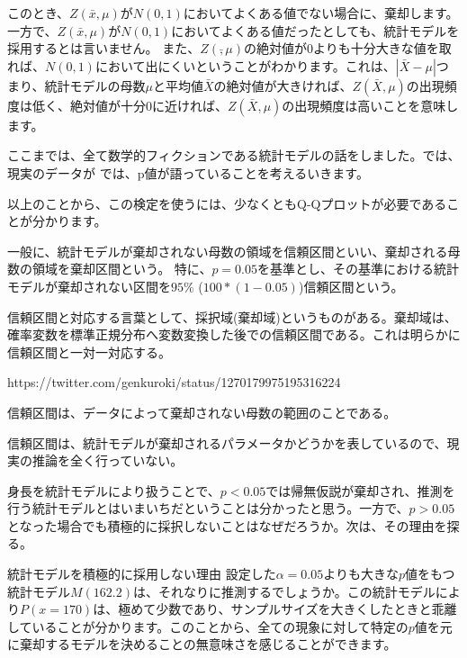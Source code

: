 \fi







このとき、$Z(\bar{x},\mu)$が$N(0,1)$においてよくある値でない場合に、棄却します。
一方で、$Z(\bar{x},\mu)$が$N(0,1)$においてよくある値だったとしても、統計モデルを採用するとは言いません。
また、$Z(\bar,\mu)$の絶対値が$0$よりも十分大きな値を取れば、$N(0,1)$において出にくいということがわかります。これは、$|\bar{X}-\mu|$つまり、統計モデルの母数$\mu$と平均値$\bar{X}$の絶対値が大きければ、$Z(\bar{X},\mu)$の出現頻度は低く、絶対値が十分$0$に近ければ、$Z(\bar{X},\mu)$の出現頻度は高いことを意味します。

ここまでは、全て数学的フィクションである統計モデルの話をしました。では、現実のデータが
では、p値が語っていることを考えるいきます。


以上のことから、この検定を使うには、少なくともQ-Qプロットが必要であることが分かります。


一般に、統計モデルが棄却されない母数の領域を信頼区間といい、棄却される母数の領域を棄却区間という。
特に、$p=0.05$を基準とし、その基準における統計モデルが棄却されない区間を$95\%$ ($100*(1-0.05)$)信頼区間という。


信頼区間と対応する言葉として、採択域(棄却域)というものがある。棄却域は、確率変数を標準正規分布へ変数変換した後での信頼区間である。これは明らかに信頼区間と一対一対応する。

https://twitter.com/genkuroki/status/1270179975195316224


信頼区間は、データによって棄却されない母数の範囲のことである。

信頼区間は、統計モデルが棄却されるパラメータかどうかを表しているので、現実の推論を全く行っていない。

身長を統計モデルにより扱うことで、$p<0.05$では帰無仮説が棄却され、推測を行う統計モデルとはいまいちだということは分かったと思う。一方で、$p>0.05$となった場合でも積極的に採択しないことはなぜだろうか。次は、その理由を探る。
\fi



\begin{SMbox}{統計モデルを積極的に採用しない理由}
設定した$\alpha=0.05$よりも大きな$p$値をもつ統計モデル$M(162.2)$は、それなりに推測するでしょうか。この統計モデルにより$P(x=170)$は、極めて少数であり、サンプルサイズを大きくしたときと乖離していることが分かります。このことから、全ての現象に対して特定の$p$値を元に棄却するモデルを決めることの無意味さを感じることができます。
\end{SMbox}
\fi


